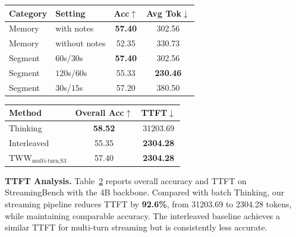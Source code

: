 \documentclass{article}
\begin{document}
\begin{table}[t]
\centering
\begin{minipage}[t]{0.49\linewidth}
\centering
{}
\label{tab:memory_ablation}
{\scriptsize
\setlength{\tabcolsep}{4pt}
\renewcommand{\arraystretch}{1.06}
\begin{tabular}{@{}llcc@{}}
\toprule
\textbf{Category} & \textbf{Setting} & \textbf{Acc}$\uparrow$ & \textbf{Avg Tok}$\downarrow$ \\
\midrule
Memory & with notes & \textbf{57.40} & 302.56 \\
Memory & without notes & 52.35 & 330.73 \\
\midrule
Segment & $60$s/$30$s & \textbf{57.40} & 302.56 \\
Segment & $120$s/$60$s & 55.33 & \textbf{230.46} \\
Segment & $30$s/$15$s & 57.20 & 380.50 \\
\bottomrule
\end{tabular}}
\end{minipage}\hfill
\begin{minipage}[t]{0.49\linewidth}
\centering
{}
\label{tab:ttft}
{\scriptsize
\setlength{\tabcolsep}{6pt}
\renewcommand{\arraystretch}{1.06}
\begin{tabular}{@{}lcc@{}}
\toprule
\textbf{Method} & \textbf{Overall Acc}$\uparrow$ & \textbf{TTFT}$\downarrow$ \\
\midrule
Thinking & \textbf{58.52} & 31203.69 \\
Interleaved & 55.35 & \textbf{2304.28} \\
TWW$_{\text{multi-turn,S3}}$ & 57.40 & \textbf{2304.28} \\
\bottomrule
\end{tabular}}
\end{minipage}
\end{table}

\noindent\textbf{TTFT Analysis.}
\label{sec:analysis_ttft}
Table~\ref{tab:ttft} reports overall accuracy and TTFT on StreamingBench with the 4B backbone. Compared with batch Thinking, our streaming pipeline reduces TTFT by \textbf{92.6\%}, from 31203.69 to 2304.28 tokens, while maintaining comparable accuracy. The interleaved baseline achieves a similar TTFT for multi-turn streaming but is consistently less accurate.
\end{document}
